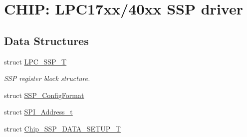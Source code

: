 \hypertarget{group__SSP__17XX__40XX}{\section{C\-H\-I\-P\-: L\-P\-C17xx/40xx S\-S\-P driver}
\label{group__SSP__17XX__40XX}
}
\subsection*{Data Structures}
\begin{DoxyCompactItemize}
\item 
struct \hyperlink{structLPC__SSP__T}{L\-P\-C\-\_\-\-S\-S\-P\-\_\-\-T}
\begin{DoxyCompactList}\small\item\em S\-S\-P register block structure. \end{DoxyCompactList}\item 
struct \hyperlink{structSSP__ConfigFormat}{S\-S\-P\-\_\-\-Config\-Format}
\item 
struct \hyperlink{structSPI__Address__t}{S\-P\-I\-\_\-\-Address\-\_\-t}
\item 
struct \hyperlink{structChip__SSP__DATA__SETUP__T}{Chip\-\_\-\-S\-S\-P\-\_\-\-D\-A\-T\-A\-\_\-\-S\-E\-T\-U\-P\-\_\-\-T}
\end{DoxyCompactItemize}
